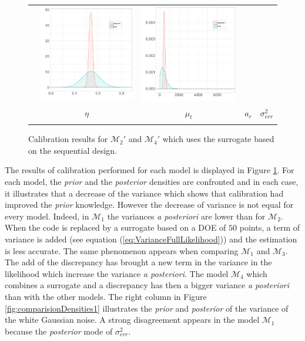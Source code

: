 \documentclass[soumission]{jsfds}
\begin{document}
\begin{figure}[htbp!]
\begin{center}
\begin{tabular}{ccccc}
    &  \includegraphics[width=.2\textwidth]{new/Model4sd/ar.pdf}
	&  \includegraphics[width=.2\textwidth]{new/Model4sd/Serr.pdf}\\
		 & $\eta$ & $\mu_t$ & $a_r$ & $\sigma_{err}^2$\\
	&&&&\\
  \end{tabular}
\caption{Calibration results for $\mathcal{M}_2'$ and $\mathcal{M}_4'$ which uses the surrogate based on the sequential design.}
\label{fig:calibrationSeq}
\end{center}
\end{figure}





 
The results of calibration performed for each model is displayed in Figure \ref{fig:calibrationSeq}. For each model, the \textit{prior} and the \textit{posterior} densities are confronted and in each case, it illustrates that a decrease of the variance which shows that calibration had improved the \textit{prior} knowledge. However the decrease of variance is not equal for every model. Indeed, in $\mathcal{M}_1$ the variances \textit{a posteriori} are lower than for $\mathcal{M}_2$. When the code is replaced by a surrogate based on a DOE of $50$ points, a term of variance is added (see equation (\ref{eq:VarianceFullLikelihood})) and the estimation is less accurate. The same phenomenon appears when comparing $\mathcal{M}_1$ and $\mathcal{M}_3$. The add of the discrepancy has brought a new term in the variance in the likelihood which increase the variance \textit{a posteriori}. The model $\mathcal{M}_4$ which combines a surrogate and a discrepancy has then a bigger variance \textit{a posteriori} than with the other models. The right column in Figure \ref{fig:comparisionDensities1} illustrates the \textit{prior} and \textit{posterior} of the variance of the white Gaussian noise. A strong disagreement appears in the model $\mathcal{M}_1$ because the \textit{posterior} mode of $\sigma_{err}^2$.
\end{document}
